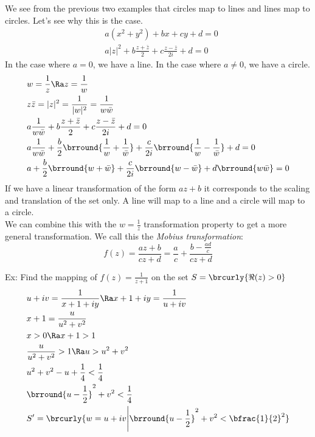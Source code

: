 We see from the previous two examples that circles map to lines and lines map to circles. Let's see why this is the case.
\begin{align*}
    &a(x^2+y^2)+bx+cy+d=0\\
    &a|z|^2+b\frac{z+\bar{z}}{2}+c\frac{z-\bar{z}}{2i}+d=0
\end{align*}
In the case where $a=0$, we have a line. In the case where $a\neq0$, we have a circle.
\begin{align*}
    &w=\frac{1}{z}\Ra z=\frac{1}{w}\\
    &z\bar{z}=|z|^2=\frac{1}{|w|^2}=\frac{1}{w\bar{w}}\\
    &a\frac{1}{w\bar{w}}+b\frac{z+\bar{z}}{2}+c\frac{z-\bar{z}}{2i}+d=0\\
    &a\frac{1}{w\bar{w}}+\frac{b}{2}\brround{\frac{1}{w}+\frac{1}{\bar{w}}}+\frac{c}{2i}\brround{\frac{1}{w}-\frac{1}{\bar{w}}}+d=0\\
    &a+\frac{b}{2}\brround{w+\bar{w}}+\frac{c}{2i}\brround{w-\bar{w}}+d\brround{w\bar{w}}=0\\
\end{align*}
If we have a linear transformation of the form $az+b$ it corresponds to the scaling and translation of the set only. A line will map to a line and a circle will map to a circle.\\
We can combine this with the $w=\frac{1}{z}$ transformation property to get a more general transformation. We call this the \textit{Mobius transformation}:
$$f(z)=\frac{az+b}{cz+d}=\frac{a}{c}+\frac{b-\tfrac{ad}{c}}{cz+d}$$

Ex: Find the mapping of $f(z)=\frac{1}{z+1}$ on the set $S=\brcurly{\Re(z)>0}$ 
\begin{align*}
    &u+iv=\frac{1}{x+1+iy}\Ra x+1+iy=\frac{1}{u+iv}\\
    &x+1=\frac{u}{u^2+v^2}\\
    &x>0\Ra x+1>1\\
    &\frac{u}{u^2+v^2}>1\Ra u>u^2+v^2\\
    &u^2+v^2-u+\frac{1}{4}<\frac{1}{4}\\
    &\brround{u-\frac{1}{2}}^2+v^2<\frac{1}{4}\\
    &S'=\brcurly{w=u+iv\Bigg\vert\brround{u-\frac{1}{2}}^2+v^2<\bfrac{1}{2}^2}
\end{align*}

